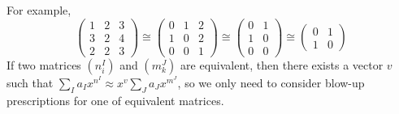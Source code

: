 \documentclass[12pt]{article}
\theoremstyle{definition}
\theoremstyle{plain}
\begin{document}
For example, 
\[
\begin{pmatrix}
	1&2&3\\
	3&2&4\\
	2&2&3
\end{pmatrix}\cong
\begin{pmatrix}
	0&1&2\\
	1&0&2\\
	0&0&1
\end{pmatrix}\cong
\begin{pmatrix}
	0&1\\
	1&0\\
	0&0
\end{pmatrix}\cong
\begin{pmatrix}
	0&1\\
	1&0
\end{pmatrix} 
\]
If two matrices $(n^I_i)$ and $(m^J_k)$ are equivalent, then there exists a vector $v$ such that 
$\sum_I a_I x^{n^I}\approx x^v\sum_J a_J x^{m^J}$, so we only need to consider blow-up prescriptions for one of equivalent matrices.

\vspace{2ex}
\end{document}
